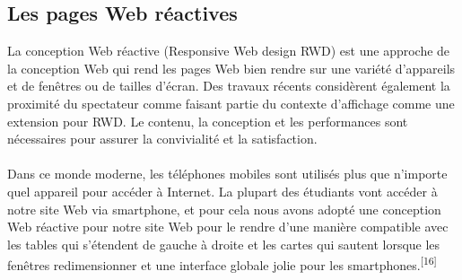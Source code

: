 \documentclass[12pt]{report}
\begin{document}
\newpage

\subsection{Les pages Web réactives}

La conception Web réactive (Responsive Web design RWD) est une approche de la conception Web qui rend les pages Web bien rendre sur une variété d’appareils et de fenêtres ou de tailles d’écran. Des travaux récents considèrent également la proximité du spectateur comme faisant partie du contexte d’affichage comme une extension pour RWD. Le contenu, la conception et les performances sont nécessaires pour assurer la convivialité et la satisfaction.
\\\\
Dans ce monde moderne, les téléphones mobiles sont utilisés plus que n’importe quel appareil pour accéder à Internet. La plupart des étudiants vont accéder à notre site Web via smartphone, et pour cela nous avons adopté une conception Web réactive pour notre site Web pour le rendre d’une manière compatible avec les tables qui s’étendent de gauche à droite et les cartes qui sautent lorsque les fenêtres redimensionner et une interface globale jolie pour les smartphones.\textsuperscript{[16]}

\vspace{0.8in}
\end{document}
